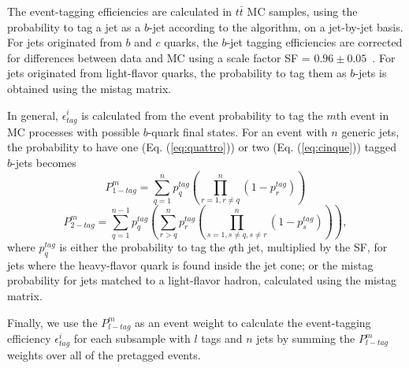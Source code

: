\documentclass[aps,prd,twocolumn,superscriptaddress,showpacs]{revtex4}
\begin{document}
The event-tagging efficiencies 
are calculated in $t\bar{t}$ MC samples, using the probability to tag a jet as a $b$-jet according to the 
{}
algorithm, on a jet-by-jet basis. For jets originated from $b$ and $c$ quarks, the $b$-jet 
tagging efficiencies are corrected for differences between data and MC using a scale factor 
SF = $0.96 \pm 0.05$~\cite{SF}. For jets originated from light-flavor quarks, the probability to tag them as 
$b$-jets is obtained using the mistag matrix.

In general, $\epsilon_{tag}^{i}$ is calculated from the  event probability %
to tag the $m$th event in MC processes with
possible $b$-quark final states. For an event with $n$ generic jets, the probability to have one 
(Eq. (\ref{eq:quattro})) or two
(Eq. (\ref{eq:cinque})) tagged
$b$-jets  becomes
\begin{equation}
P_{1-tag}^{m} = \sum_{q=1}^{n} p^{tag}_{q}   \left( \prod_{r=1,r\neq q}^{n} \left(1-p_{r}^{tag} \right) \right)
\label{eq:quattro}
\end{equation}
\begin{equation}
P_{2-tag}^{m} = \sum_{q=1}^{n-1} p^{tag}_{q}  \left(\sum_{r>q}^{n} p^{tag}_{r}  \left( \prod_{s=1,s\neq q, s\neq r}^{n} \left(1-p_{s}^{tag} \right) \right) \right),  
\label{eq:cinque}
\end{equation}
where $p_{q}^{tag}$ is either the probability to tag the $q$th jet, multiplied by the SF, for jets where the 
heavy-flavor quark is found inside the jet cone; or the mistag probability for jets matched to a light-flavor hadron, calculated using the mistag
matrix.

Finally, we use the $P_{l-tag}^m$ as an event  weight to calculate the event-tagging efficiency $\epsilon^i_{tag}$
for each subsample with $l$ tags and $n$ jets by summing the $P_{l-tag}^{m}$ weights over all of the pretagged events.
\end{document}
